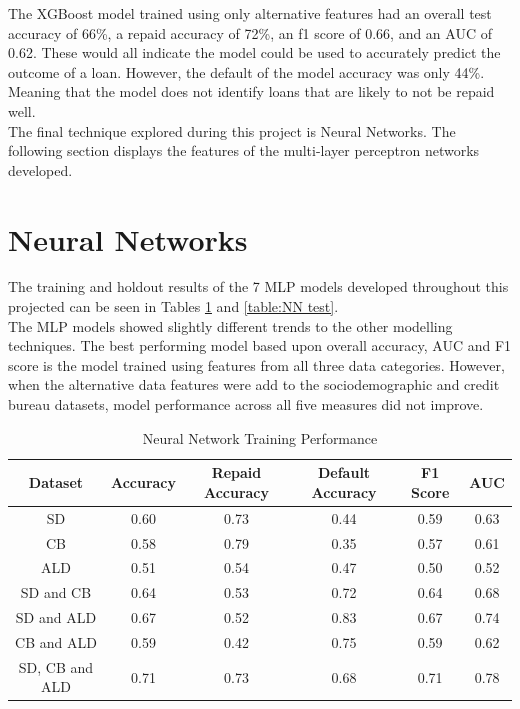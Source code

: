 The XGBoost model trained using only alternative features had an overall test accuracy of 66\%, a repaid accuracy of 72\%, an f1 score of 0.66, and an AUC of 0.62. These would all indicate the model could be used to accurately predict the outcome of a loan. However, the default of the model accuracy was only 44\%. Meaning that the model does not identify loans that are likely to not be repaid well. \\

The final technique explored during this project is Neural Networks. The following section displays the features of the multi-layer perceptron networks developed.  



\section{Neural Networks}

The training and holdout results of the 7 MLP models developed throughout this projected can be seen in Tables \ref{table:NN training} and \ref{table:NN test}.  \\

The MLP models showed slightly different trends to the other modelling techniques. The best performing model based upon overall accuracy, AUC and F1 score is the model trained using features from all three data categories. However, when the alternative data features were add to the sociodemographic and credit bureau datasets, model performance across all five measures did not improve.    

\vspace{10pt}

\begin{table}[H]
\begin{center}
\begin{tabular}{|c|c|c|c|c|c|} 
\hline
\multicolumn{1}{|c|}{Dataset}
&\multicolumn{1}{|c|}{Accuracy}
&\multicolumn{1}{|c|}{Repaid Accuracy}
&\multicolumn{1}{|c|}{Default Accuracy}
&\multicolumn{1}{|c|}{F1 Score}
&\multicolumn{1}{|c|}{AUC}\\
\hline
SD & 0.60 & 0.73 & 0.44 & 0.59 & 0.63    \\
\hline
CB & 0.58 & 0.79 & 0.35 & 0.57 & 0.61    \\
\hline
ALD & 0.51 & 0.54 & 0.47 & 0.50 & 0.52    \\
\hline
SD and CB & 0.64 & 0.53 & 0.72 & 0.64 & 0.68    \\
\hline
SD and ALD & 0.67 & 0.52 & 0.83 & 0.67 & 0.74    \\
\hline
CB and ALD & 0.59 & 0.42 & 0.75 & 0.59 & 0.62    \\
\hline
SD, CB and ALD & 0.71 & 0.73 & 0.68 & 0.71 & 0.78    \\
\hline
\end{tabular}
\end{center}
\caption{Neural Network Training Performance}
\label{table:NN training}
\end{table}


